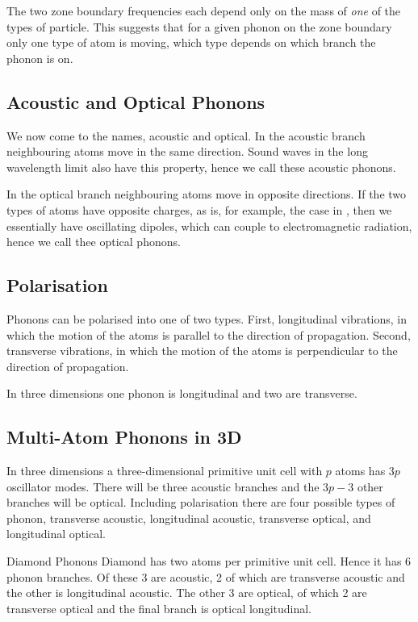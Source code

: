 \documentclass[fleqn]{NotesClass}
\begin{document}
    The two zone boundary frequencies each depend only on the mass of \emph{one} of the types of particle.
    This suggests that for a given phonon on the zone boundary only one type of atom is moving, which type depends on which branch the phonon is on.
    
    \subsection{Acoustic and Optical Phonons}
    We now come to the names, acoustic and optical.
    In the acoustic branch neighbouring atoms move in the same direction.
    Sound waves in the long wavelength limit also have this property, hence we call these acoustic phonons.
    
    In the optical branch neighbouring atoms move in opposite directions.
    If the two types of atoms have opposite charges, as is, for example, the case in , then we essentially have oscillating dipoles, which can couple to electromagnetic radiation, hence we call thee optical phonons.
    
    \subsection{Polarisation}
    Phonons can be polarised into one of two types.
    First, longitudinal vibrations, in which the motion of the atoms is parallel to the direction of propagation.
    Second, transverse vibrations, in which the motion of the atoms is perpendicular to the direction of propagation.

    In three dimensions one phonon is longitudinal and two are transverse.
    
    \subsection{Multi-Atom Phonons in 3D}
    In three dimensions a three-dimensional primitive unit cell with \(p\) atoms has \(3p\) oscillator modes.
    There will be three acoustic branches and the \(3p - 3\) other branches will be optical.
    Including polarisation there are four possible types of phonon, transverse acoustic, longitudinal acoustic, transverse optical, and longitudinal optical.
    
    \begin{exm}{Diamond Phonons}{}
        Diamond has two atoms per primitive unit cell.
        Hence it has 6 phonon branches.
        Of these 3 are acoustic, 2 of which are transverse acoustic and the other is longitudinal acoustic.
        The other 3 are optical, of which 2 are transverse optical and the final branch is optical longitudinal.
    \end{exm}
\end{document}
